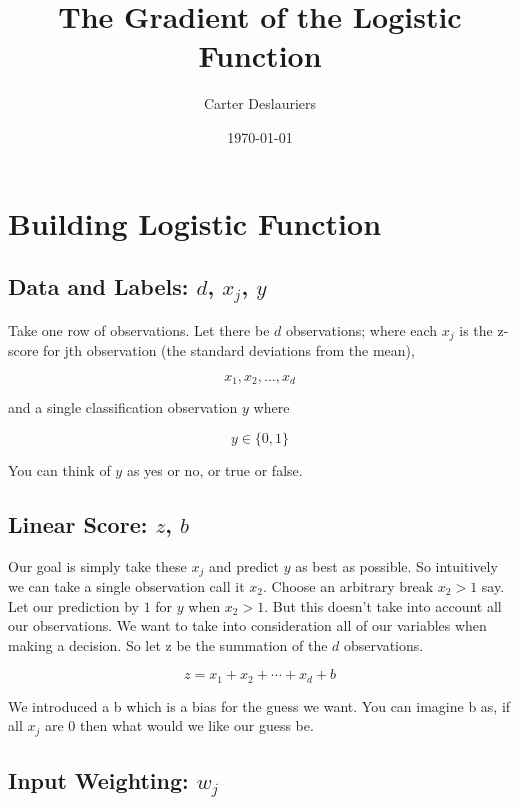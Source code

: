 \documentclass{article}
\title{The Gradient of the Logistic Function}
\author{Carter Deslauriers}
\date{\today}
\theoremstyle{remark}
\begin{document}
\maketitle

\section{Building Logistic Function}

\subsection{Data and Labels: $d$, $x_j$, $y$}

Take one row of observations. Let there be $d$ observations; where each $x_j$
is the z-score for jth observation (the standard deviations from the mean), 

\begin{equation*}
    x_1, x_2, \ldots, x_d
\end{equation*} 

and a single classification observation $y$ where

\begin{equation*}
    y \in \{0, 1\}
\end{equation*} 

You can think of $y$ as yes or no, or true or false.

\subsection{Linear Score: $z$, $b$}

Our goal is simply take these $x_j$ and predict $y$ as best as possible.
So intuitively we can take a single observation call it $x_2$. Choose an arbitrary break
$x_2 > 1$ say. Let our prediction by $1$ for $y$ when $x_2 > 1$.
But this doesn't take into account all our observations. We want to take
into consideration all of our variables when making a decision. So let
z be the summation of the $d$ observations.

\begin{equation*}
z = x_1 + x_2 + \cdots + x_d + b
\end{equation*} 

We introduced a b
which is a bias for the guess we want. You can imagine b as, if all $x_j$ are 0 then
what would we like our guess be. 

\subsection{Input Weighting: $w_j$}
\end{document}

